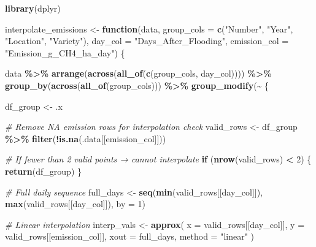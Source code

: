 \documentclass[
]{article}
\newenvironment{Shaded}{\begin{snugshade}}{\end{snugshade}}
\newcommand{\AttributeTok}[1]{\textcolor[rgb]{0.13,0.29,0.53}{#1}}
\newcommand{\CommentTok}[1]{\textcolor[rgb]{0.56,0.35,0.01}{\textit{#1}}}
\newcommand{\ControlFlowTok}[1]{\textcolor[rgb]{0.13,0.29,0.53}{\textbf{#1}}}
\newcommand{\DecValTok}[1]{\textcolor[rgb]{0.00,0.00,0.81}{#1}}
\newcommand{\FunctionTok}[1]{\textcolor[rgb]{0.13,0.29,0.53}{\textbf{#1}}}
\newcommand{\NormalTok}[1]{#1}
\newcommand{\OtherTok}[1]{\textcolor[rgb]{0.56,0.35,0.01}{#1}}
\newcommand{\SpecialCharTok}[1]{\textcolor[rgb]{0.81,0.36,0.00}{\textbf{#1}}}
\newcommand{\StringTok}[1]{\textcolor[rgb]{0.31,0.60,0.02}{#1}}
\begin{document}
\begin{Shaded}
\begin{Highlighting}[]
\FunctionTok{library}\NormalTok{(dplyr)}

\NormalTok{interpolate\_emissions }\OtherTok{\textless{}{-}} \ControlFlowTok{function}\NormalTok{(data,}
                                  \AttributeTok{group\_cols =} \FunctionTok{c}\NormalTok{(}\StringTok{"Number"}\NormalTok{, }\StringTok{"Year"}\NormalTok{, }\StringTok{"Location"}\NormalTok{, }\StringTok{"Variety"}\NormalTok{),}
                                  \AttributeTok{day\_col =} \StringTok{"Days\_After\_Flooding"}\NormalTok{,}
                                  \AttributeTok{emission\_col =} \StringTok{"Emission\_g\_CH4\_ha\_day"}\NormalTok{) \{}

\NormalTok{  data }\SpecialCharTok{\%\textgreater{}\%}
    \FunctionTok{arrange}\NormalTok{(}\FunctionTok{across}\NormalTok{(}\FunctionTok{all\_of}\NormalTok{(}\FunctionTok{c}\NormalTok{(group\_cols, day\_col)))) }\SpecialCharTok{\%\textgreater{}\%}
    \FunctionTok{group\_by}\NormalTok{(}\FunctionTok{across}\NormalTok{(}\FunctionTok{all\_of}\NormalTok{(group\_cols))) }\SpecialCharTok{\%\textgreater{}\%}
    \FunctionTok{group\_modify}\NormalTok{(}\SpecialCharTok{\textasciitilde{}}\NormalTok{ \{}

\NormalTok{      df\_group }\OtherTok{\textless{}{-}}\NormalTok{ .x}

      \CommentTok{\# Remove NA emission rows for interpolation check}
\NormalTok{      valid\_rows }\OtherTok{\textless{}{-}}\NormalTok{ df\_group }\SpecialCharTok{\%\textgreater{}\%}
        \FunctionTok{filter}\NormalTok{(}\SpecialCharTok{!}\FunctionTok{is.na}\NormalTok{(.data[[emission\_col]]))}

      \CommentTok{\# If fewer than 2 valid points → cannot interpolate}
      \ControlFlowTok{if}\NormalTok{ (}\FunctionTok{nrow}\NormalTok{(valid\_rows) }\SpecialCharTok{\textless{}} \DecValTok{2}\NormalTok{) \{}
        \FunctionTok{return}\NormalTok{(df\_group)}
\NormalTok{      \}}

      \CommentTok{\# Full daily sequence}
\NormalTok{      full\_days }\OtherTok{\textless{}{-}} \FunctionTok{seq}\NormalTok{(}\FunctionTok{min}\NormalTok{(valid\_rows[[day\_col]]),}
                       \FunctionTok{max}\NormalTok{(valid\_rows[[day\_col]]),}
                       \AttributeTok{by =} \DecValTok{1}\NormalTok{)}

      \CommentTok{\# Linear interpolation}
\NormalTok{      interp\_vals }\OtherTok{\textless{}{-}} \FunctionTok{approx}\NormalTok{(}
        \AttributeTok{x =}\NormalTok{ valid\_rows[[day\_col]],}
        \AttributeTok{y =}\NormalTok{ valid\_rows[[emission\_col]],}
        \AttributeTok{xout =}\NormalTok{ full\_days,}
        \AttributeTok{method =} \StringTok{"linear"}
\NormalTok{      )}


\end{Highlighting}
\end{Shaded}
\end{document}
